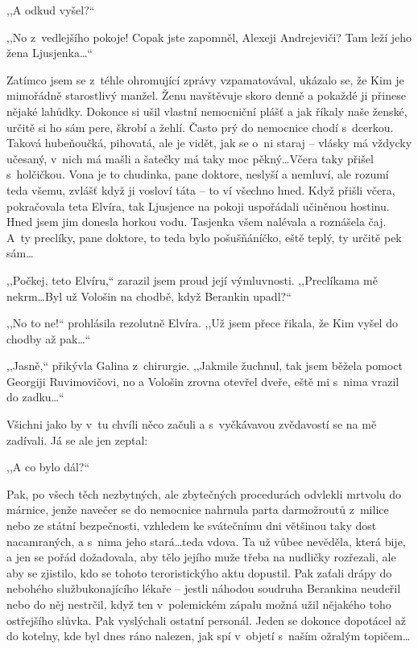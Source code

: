 ,,A odkud vyšel?“

,,No z~vedlejšího pokoje! Copak jste zapomněl, Alexeji Andrejeviči? Tam leží jeho žena Ljusjenka\ldots“

Zatímco jsem se z~téhle ohromující zprávy vzpamatovával, ukázalo se, že Kim je mimořádně starostlivý manžel. Ženu navštěvuje skoro denně a pokaždé ji přinese nějaké lahůdky. Dokonce si ušil vlastní nemocniční plášť a jak říkaly naše ženské, určitě si ho sám pere, škrobí a žehlí. Často prý do nemocnice chodí s~dcerkou. Taková hubeňoučká, pihovatá, ale je vidět, jak se o~ni staraj – vlásky má vždycky učesaný, v~nich má mašli a šatečky má taky moc pěkný\ldots Včera taky přišel s~holčičkou. Vona je to chudinka, pane doktore, neslyší a nemluví, ale rozumí teda všemu, zvlášť když ji vosloví táta – to ví všechno hned. Když přišli včera, pokračovala teta Elvíra, tak Ljusjence na pokoji uspořádali učiněnou hostinu. Hned jsem jim donesla horkou vodu. Tasjenka všem nalévala a roznášela čaj. A~ty preclíky, pane doktore, to teda bylo pošušňáníčko, eště teplý, ty určitě pek sám\ldots

,,Počkej, teto Elvíru,“ zarazil jsem proud její výmluvnosti. ,,Preclíkama mě nekrm\ldots Byl už Vološin na chodbě, když Berankin upadl?“

,,No to ne!“ prohlásila rezolutně Elvíra. ,,Už jsem přece řikala, že Kim vyšel do chodby až pak\ldots“

,,Jasně,“ přikývla Galina z~chirurgie. ,,Jakmile žuchnul, tak jsem běžela pomoct Georgiji Ruvimovičovi, no a Vološin zrovna otevřel dveře, eště mi s~nima vrazil do zadku\ldots“

Všichni jako by v~tu chvíli něco začuli a s~vyčkávavou zvědavostí se na mě zadívali. Já se ale jen zeptal:

,,A co bylo dál?“

Pak, po všech těch nezbytných, ale zbytečných procedurách odvlekli mrtvolu do márnice, jenže navečer se do nemocnice nahrnula parta darmožroutů z~milice nebo ze státní bezpečnosti, vzhledem ke svátečnímu dni většinou taky dost nacamraných, a s~nima jeho stará\ldots teda vdova. Ta už vůbec nevěděla, která bije, a jen se pořád dožadovala, aby tělo jejího muže třeba na nudličky rozřezali, ale aby se zjistilo, kdo se tohoto teroristickýho aktu dopustil. Pak zaťali drápy do nebohého službukonajícího lékaře –  jestli náhodou soudruha Berankina neudeřil nebo do něj nestrčil, když ten v~polemickém zápalu možná užil nějakého toho ostřejšího slůvka. Pak vyslýchali ostatní personál. Jeden se dokonce dopotácel až do kotelny, kde byl dnes ráno nalezen, jak spí v~objetí s~naším ožralým topičem\ldots

